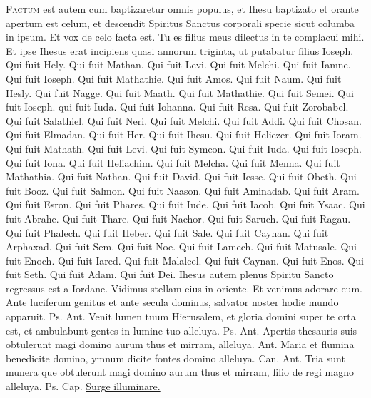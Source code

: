 \begin{multicols*}{2}
\lettrine[lines=2]{\zallmancaps \color{Red} F}{actum} est autem cum baptizaretur omnis populus, et Ihesu baptizato et orante apertum est celum, et descendit Spiritus Sanctus corporali specie sicut columba in ipsum. Et vox de celo facta est. Tu es filius meus dilectus in te complacui mihi. Et ipse Ihesus erat incipiens quasi annorum triginta, ut putabatur filius Ioseph. Qui fuit Hely. Qui fuit Mathan. Qui fuit Levi. Qui fuit Melchi. Qui fuit Iamne. Qui fuit Ioseph. Qui fuit Mathathie. Qui fuit Amos. Qui fuit Naum. Qui fuit Hesly. Qui fuit Nagge. Qui fuit Maath. Qui fuit Mathathie. Qui fuit Semei. Qui fuit Ioseph. qui fuit Iuda. Qui fuit Iohanna. Qui fuit Resa. Qui fuit Zorobabel. Qui fuit Salathiel. Qui fuit Neri. Qui fuit Melchi. Qui fuit Addi. Qui fuit Chosan. Qui fuit Elmadan. Qui fuit Her. Qui fuit Ihesu. Qui fuit Heliezer. Qui fuit Ioram. Qui fuit Mathath. Qui fuit Levi. Qui fuit Symeon. Qui fuit Iuda. Qui fuit Ioseph. Qui fuit Iona. Qui fuit Heliachim. Qui fuit Melcha. Qui fuit Menna. Qui fuit Mathathia. Qui fuit Nathan. Qui fuit David. Qui fuit Iesse. Qui fuit Obeth. Qui fuit Booz. Qui fuit Salmon. Qui fuit Naason. Qui fuit Aminadab. Qui fuit Aram. Qui fuit Esron. Qui fuit Phares. Qui fuit Iude. Qui fuit Iacob. Qui fuit Ysaac. Qui fuit Abrahe. Qui fuit Thare. Qui fuit Nachor. Qui fuit Saruch. Qui fuit Ragau. Qui fuit Phalech. Qui fuit Heber. Qui fuit Sale. Qui fuit Caynan. Qui fuit Arphaxad. Qui fuit Sem. Qui fuit Noe. Qui fuit Lamech. Qui fuit Matusale. Qui fuit Enoch. Qui fuit Iared. Qui fuit Malaleel. Qui fuit Caynan. Qui fuit Enos. Qui fuit Seth. Qui fuit Adam. Qui fuit Dei. Ihesus autem plenus Spiritu Sancto regressus est a Iordane.
 \V Vidimus stellam eius in oriente. \R Et venimus adorare eum.
 Ante luciferum genitus et ante secula dominus, salvator noster hodie mundo apparuit. {\color{Red} Ps.}  {\color{Red} Ant.} Venit lumen tuum Hierusalem, et gloria domini super te orta est, et ambulabunt gentes in lumine tuo alleluya. {\color{Red} Ps.}  {\color{Red} Ant.} Apertis thesauris suis obtulerunt magi domino aurum thus et mirram, alleluya.  {\color{Red} Ant.} Maria et flumina benedicite domino, ymnum dicite fontes domino alleluya. {\color{Red} Can.}  {\color{Red} Ant.} Tria sunt munera que obtulerunt magi domino aurum thus et mirram, filio de regi magno alleluya. {\color{Red} Ps.}  {\color{Red} Cap.} \hyperlink{surge-capitulum}{Surge illuminare.}
\end{multicols*}
